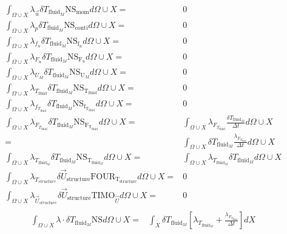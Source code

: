 \documentclass[10pt]{article} %
\begin{document}
\begin{center}
\begin{align*}
	\int_{\Omega \cup X} \lambda_{\vec{u}} \delta T_{\text{fluid}_M} \text{NS}_{\text{mom}} d\Omega \cup X =&  0\\
	\int_{\Omega \cup X} \lambda_p \delta T_{\text{fluid}_M} \text{NS}_{\text{conti}} d\Omega \cup X =& 0\\
	\int_{\Omega \cup X} \lambda_{f_u} \delta T_{\text{fluid}_M} \text{NS}_{\text{f}_u} d\Omega \cup X =& 0\\
	\int_{\Omega \cup X} \lambda_{F_u} \delta T_{\text{fluid}_M} \text{NS}_{\text{F}_u} d\Omega \cup X =& 0\\
	\int_{\Omega \cup X} \lambda_{U_M} \delta T_{\text{fluid}_M} \text{NS}_{\text{U}_M} d\Omega \cup X =& 0\\
	\int_{\Omega \cup X} \lambda_{T_{\text{fluid}}} \delta T_{\text{fluid}_M} \text{NS}_{\text{T}_{\text{fluid}}} d\Omega \cup X =& 0\\
	\int_{\Omega \cup X} \lambda_{f_{T_{\text{fluid}}}} \delta T_{\text{fluid}_M} \text{NS}_{\text{f}_{\text{T}_{\text{fluid}}}} d\Omega \cup X =& 0\\
	\int_{\Omega \cup X} \lambda_{F_{T_{\text{fluid}}}} \delta T_{\text{fluid}_M} \text{NS}_{\text{F}_{\text{T}_{\text{fluid}}}} d\Omega \cup X 
	=& \int_{\Omega \cup X} \lambda_{F_{T_{\text{fluid}}}} \frac{\delta T_{\text{fluid}_M}}{\Delta t} d\Omega \cup X\\
	=& \int_{\Omega \cup X} \delta T_{\text{fluid}_M}  \frac{\lambda_{F_{T_{\text{fluid}}}}}{\Delta t} d\Omega \cup X\\
	\int_{\Omega \cup X} \lambda_{T_{\text{fluid}_M}} \delta T_{\text{fluid}_M} \text{NS}_{\text{T}_{\text{fluid}_M}} d\Omega \cup X =& \int_{\Omega \cup X} \lambda_{T_{\text{fluid}_M}} \delta T_{\text{fluid}_M} d\Omega \cup X\\
	\int_{\Omega \cup X} \lambda_{T_{structure}} \delta \vec{U}_{\text{structure}} \text{FOUR}_{\text{T}_{\text{structure}}} d\Omega \cup X =& 0\\
	\int_{\Omega \cup X} \lambda_{\vec{U}_{structure}} \delta \vec{U}_{\text{structure}} \text{TIMO}_{\vec{U}} d\Omega \cup X =& 0\\
\end{align*}
\begin{align*}
	\int_{\Omega \cup X} \lambda \cdot \delta T_{\text{fluid}_M} \text{NS}d\Omega \cup X 
	=&\int_{X} \delta T_{\text{fluid}_M} \left[ \lambda_{T_{\text{fluid}_M}} + \frac{\lambda_{F_{T_{\text{fluid}}}}}{\Delta t} \right] d X\\

\end{align*}
\end{center}
\end{document}
